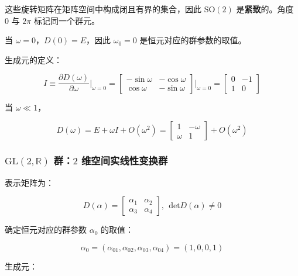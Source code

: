 这些旋转矩阵在矩阵空间中构成闭且有界的集合，因此 $\mathrm{SO}\left(2\right)$ 是\textbf{紧致}的。角度 $0$ 与 $2\pi$ 标记同一个群元。

当 $\omega=0$，$D\left(0\right)=E$，因此 $\omega_0=0$ 是恒元对应的群参数的取值。

生成元的定义：

\begin{equation}
I
\equiv \frac{\partial D\left(\omega\right) }{\partial \omega }\bigg|_{\omega=0}
=\begin{bmatrix}
-\sin\omega &-\cos\omega \\
\cos\omega  &-\sin\omega
\end{bmatrix}
\bigg|_{\omega=0}
=\begin{bmatrix}
0 &-1 \\
1 &0
\end{bmatrix}
\end{equation}

当 $\omega\ll 1$，

\begin{equation}
D\left(\omega\right)
=E + \omega I+O\left(\omega^2\right)
=\begin{bmatrix}
1 &-\omega \\
\omega &1
\end{bmatrix}+O\left(\omega^2\right)
\end{equation}

\subsubsection*{\texorpdfstring{$\mathrm{GL}\left(2,\mathbb{R}\right)$ 群：$2$ 维空间实线性变换群}{GL(2,R) 群：2 维空间实线性变换群}}

表示矩阵为：

\begin{equation}
D\left(\alpha\right)
=\begin{bmatrix}
\alpha_1 &\alpha_2 \\
\alpha_3 &\alpha_4
\end{bmatrix},~~
\mathrm{det} D\left(\alpha\right)\ne 0
\end{equation}

确定恒元对应的群参数 $\alpha_0$ 的取值：

\begin{equation}
\alpha_0
=\left(\alpha_{01},\alpha_{02},\alpha_{03},\alpha_{04}\right)
=\left(1,0,0,1\right)
\end{equation}

生成元：

